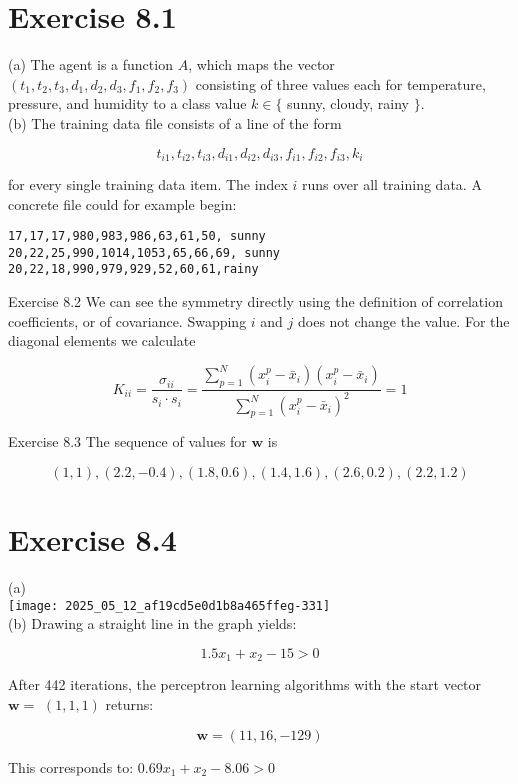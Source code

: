 \documentclass[10pt]{article}
\begin{document}
\section*{Exercise 8.1}
(a) The agent is a function $A$, which maps the vector $\left(t_{1}, t_{2}, t_{3}, d_{1}, d_{2}, d_{3}, f_{1}, f_{2}, f_{3}\right)$ consisting of three values each for temperature, pressure, and humidity to a class value $k \in\{$ sunny, cloudy, rainy $\}$.\\
(b) The training data file consists of a line of the form

$$
t_{i 1}, t_{i 2}, t_{i 3}, d_{i 1}, d_{i 2}, d_{i 3}, f_{i 1}, f_{i 2}, f_{i 3}, k_{i}
$$

for every single training data item. The index $i$ runs over all training data. A concrete file could for example begin:

\begin{verbatim}
17,17,17,980,983,986,63,61,50, sunny
20,22,25,990,1014,1053,65,66,69, sunny
20,22,18,990,979,929,52,60,61,rainy
\end{verbatim}

Exercise 8.2 We can see the symmetry directly using the definition of correlation coefficients, or of covariance. Swapping $i$ and $j$ does not change the value. For the diagonal elements we calculate

$$
K_{i i}=\frac{\sigma_{i i}}{s_{i} \cdot s_{i}}=\frac{\sum_{p=1}^{N}\left(x_{i}^{p}-\bar{x}_{i}\right)\left(x_{i}^{p}-\bar{x}_{i}\right)}{\sum_{p=1}^{N}\left(x_{i}^{p}-\bar{x}_{i}\right)^{2}}=1
$$

Exercise 8.3 The sequence of values for $\boldsymbol{w}$ is

$$
(1,1),(2.2,-0.4),(1.8,0.6),(1.4,1.6),(2.6,0.2),(2.2,1.2)
$$

\section*{Exercise 8.4}
(a)\\
\texttt{[image: 2025\_05\_12\_af19cd5e0d1b8a465ffeg-331]}\\
(b) Drawing a straight line in the graph yields:

$$
1.5 x_{1}+x_{2}-15>0
$$

After 442 iterations, the perceptron learning algorithms with the start vector $\boldsymbol{w}=$ $(1,1,1)$ returns:

$$
\boldsymbol{w}=(11,16,-129)
$$

This corresponds to: $0.69 x_{1}+x_{2}-8.06>0$
\end{document}
